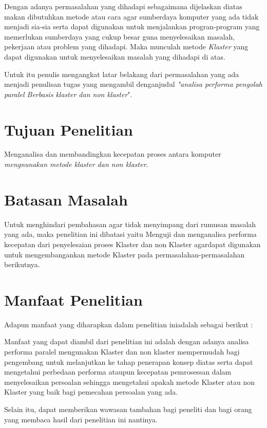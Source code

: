 \documentclass{jtetiproposalskripsi}
\begin{document}
Dengan adanya permasalahan yang dihadapi sebagaimana dijelaskan diatas makan dibutuhkan metode atau cara agar sumberdaya komputer yang ada tidak menjadi sia-sia serta dapat digunakan untuk menjalankan progran-program yang memerlukan sumberdaya yang cukup besar guna menyelesaikan masalah, pekerjaan atau problem yang dihadapi. Maka munculah metode \emph{Klaster} yang dapat digunakan untuk menyelesaikan masalah yang dihadapi di atas.

Untuk itu penulis mengangkat latar belakang dari permasalahan yang ada menjadi penulisan tugas yang mengambil denganjudul \emph{"analisa performa pengolah paralel Berbasis klaster dan non klaster}".


\section{Tujuan Penelitian}
Menganalisa dan membandingkan kecepatan proses antara komputer \emph{mengnunakan metode klaster dan non klaster}.

\section{Batasan Masalah}
Untuk menghindari pembahasan agar tidak menyimpang dari rumusan masalah yang ada, maka penelitian ini dibatasi yaitu  Menguji dan menganalisa performa kecepatan dari penyelesaian proses Klaster dan non Klaster agardapat digunakan untuk mengembangankan metode Klaster pada permasalahan-permasalahan berikutnya.

\section{Manfaat Penelitian}
Adapun manfaat yang diharapkan dalam penelitian iniadalah sebagai berikut : 
 
Manfaat yang dapat diambil dari penelitian ini adalah dengan adanya analisa performa paralel mengunakan Klaster dan non klaster mempermudah bagi pengembang untuk melanjutkan ke tahap penerapan konsep diatas serta dapat mengetahui perbedaan performa ataupun kecepatan pemrosessan dalam menyelesaikan persoalan sehingga mengetahui apakah metode Klaster atau non Klaster yang baik bagi pemecahan persoalan yang ada.


Selain itu, dapat memberikan wawasan tambahan bagi peneliti dan bagi orang yang membaca hasil dari penelitian ini nantinya.

\end{document}
